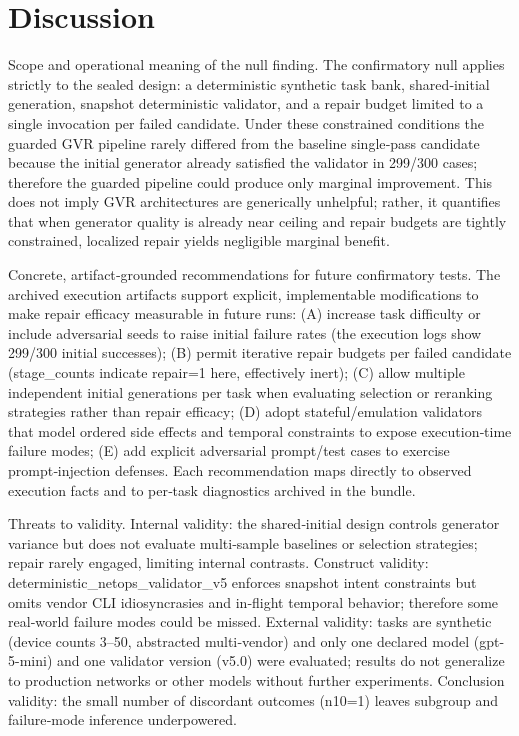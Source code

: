 \documentclass[conference]{IEEEtran}
\begin{document}
\section{Discussion}
Scope and operational meaning of the null finding. The confirmatory null applies strictly to the sealed design: a deterministic synthetic task bank, shared‑initial generation, snapshot deterministic validator, and a repair budget limited to a single invocation per failed candidate. Under these constrained conditions the guarded GVR pipeline rarely differed from the baseline single‑pass candidate because the initial generator already satisfied the validator in 299/300 cases; therefore the guarded pipeline could produce only marginal improvement. This does not imply GVR architectures are generically unhelpful; rather, it quantifies that when generator quality is already near ceiling and repair budgets are tightly constrained, localized repair yields negligible marginal benefit.

Concrete, artifact‑grounded recommendations for future confirmatory tests. The archived execution artifacts support explicit, implementable modifications to make repair efficacy measurable in future runs: (A) increase task difficulty or include adversarial seeds to raise initial failure rates (the execution logs show 299/300 initial successes); (B) permit iterative repair budgets per failed candidate (stage\_counts indicate repair=1 here, effectively inert); (C) allow multiple independent initial generations per task when evaluating selection or reranking strategies rather than repair efficacy; (D) adopt stateful/emulation validators that model ordered side effects and temporal constraints to expose execution‑time failure modes; (E) add explicit adversarial prompt/test cases to exercise prompt‑injection defenses. Each recommendation maps directly to observed execution facts and to per‑task diagnostics archived in the bundle.

Threats to validity. Internal validity: the shared‑initial design controls generator variance but does not evaluate multi‑sample baselines or selection strategies; repair rarely engaged, limiting internal contrasts. Construct validity: deterministic\_netops\_validator\_v5 enforces snapshot intent constraints but omits vendor CLI idiosyncrasies and in‑flight temporal behavior; therefore some real‑world failure modes could be missed. External validity: tasks are synthetic (device counts 3--50, abstracted multi‑vendor) and only one declared model (gpt-5-mini) and one validator version (v5.0) were evaluated; results do not generalize to production networks or other models without further experiments. Conclusion validity: the small number of discordant outcomes (n10=1) leaves subgroup and failure‑mode inference underpowered.
\end{document}
